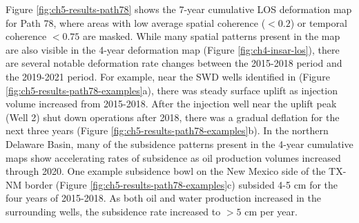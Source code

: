 Figure \ref{fig:ch5-results-path78} shows the 7-year cumulative LOS deformation map for Path 78, where areas with low average spatial coherence ($ < 0.2 $) or temporal coherence $ < 0.75 $ are masked. 
While many spatial patterns present in the map are also visible in the 4-year deformation map (Figure \ref{fig:ch4-insar-los}), there are several notable deformation rate changes between the 2015-2018 period and the 2019-2021 period.
For example, near the SWD wells identified in \cite{Kim2018AssociationLocalizedGeohazards} (Figure \ref{fig:ch5-results-path78-examples}a), there was steady surface uplift as injection volume increased from 2015-2018. After the injection well near the uplift peak (Well 2) shut down operations after 2018, there was a gradual deflation for the next three years (Figure \ref{fig:ch5-results-path78-examples}b).
In the northern Delaware Basin, many of the subsidence patterns present in the 4-year cumulative maps show accelerating rates of subsidence as oil production volumes increased through 2020.
One example subsidence bowl on the New Mexico side of the TX-NM border (Figure \ref{fig:ch5-results-path78-examples}c) subsided 4-5 cm for the four years of 2015-2018. As both oil and water production increased in the surrounding wells, the subsidence rate increased to $ >5 $ cm per year.



%


